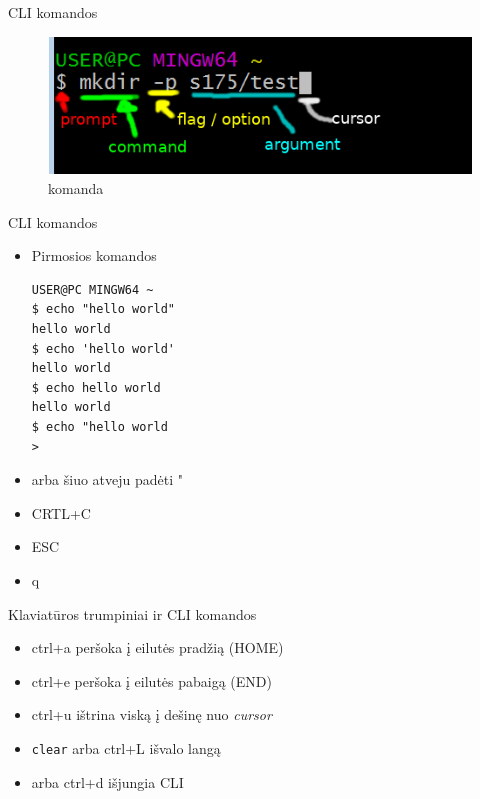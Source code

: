 \documentclass[11pt,xcolor=table]{beamer}
\begin{document}

\begin{frame}[fragile]{CLI komandos}
\begin{figure}
\caption{komanda}
\includegraphics[scale=0.7]{command.png}
\end{figure}
\end{frame}

\begin{frame}[fragile]{CLI komandos}
\begin{itemize}
\item Pirmosios komandos
\begin{lstlisting}
USER@PC MINGW64 ~
$ echo "hello world"
hello world
$ echo 'hello world'
hello world
$ echo hello world
hello world
$ echo "hello world
>
\end{lstlisting}
\item arba šiuo atveju padėti "
\item CRTL+C
\item ESC
\item q
\end{itemize}
\end{frame}
\begin{frame}{Klaviatūros trumpiniai ir CLI komandos}
\begin{itemize}
\item ctrl+a peršoka į eilutės pradžią (HOME)
\item ctrl+e peršoka į eilutės pabaigą (END)
\item ctrl+u ištrina viską į dešinę nuo \textit{cursor} 
\item \colorbox{listinggray}{\lstinline|clear|} arba ctrl+L išvalo langą
\item  arba ctrl+d išjungia CLI

\end{itemize}
\end{frame}
\end{document}
